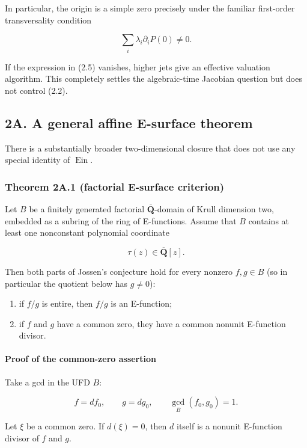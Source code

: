 In particular, the origin is a simple zero precisely under the familiar
first-order transversality condition

\[
  \sum_i\lambda_i\partial_iP(0)\ne0.                         \tag{J-2.5}
\]

If the expression in (2.5) vanishes, higher jets give an effective valuation
algorithm. This completely settles the algebraic-time Jacobian question but
does not control (2.2).

\subsection{2A. A general affine E-surface theorem}

There is a substantially broader two-dimensional closure that does not use
any special identity of \(\operatorname{Ein}\).

\subsubsection{Theorem 2A.1 (factorial E-surface criterion)}

Let \(B\) be a finitely generated factorial
\(\overline{\mathbf Q}\)-domain of Krull dimension two, embedded as a
subring of the ring of E-functions. Assume that \(B\) contains at least one
nonconstant polynomial coordinate

\[
  \tau(z)\in\overline{\mathbf Q}[z].
\]

Then both parts of Jossen's conjecture hold for every nonzero
\(f,g\in B\) (so in particular the quotient below has \(g\ne0\)):

\begin{enumerate}
\def\labelenumi{\arabic{enumi}.}
\tightlist
\item
  if \(f/g\) is entire, then \(f/g\) is an E-function;
\item
  if \(f\) and \(g\) have a common zero, they have a common nonunit
  E-function divisor.
\end{enumerate}

\paragraph{Proof of the common-zero assertion}

Take a gcd in the UFD \(B\):

\[
  f=df_0,\qquad g=dg_0,\qquad \gcd_B(f_0,g_0)=1.             \tag{J-2A.1}
\]

Let \(\xi\) be a common zero. If \(d(\xi)=0\), then \(d\) itself is a
nonunit E-function divisor of \(f\) and \(g\).

